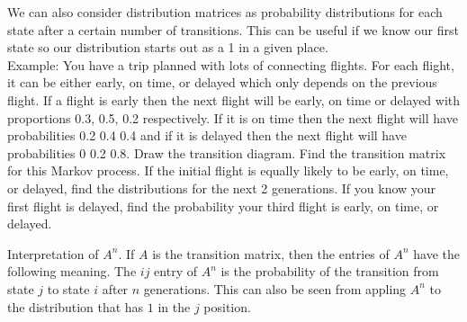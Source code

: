 \documentclass[14,fleqn]{article}
\begin{document}
We can also consider distribution matrices as probability distributions for each state after a certain number of transitions. This can be useful if we know our first state so our distribution starts out as a 1 in a given place.\\

Example: You have a trip planned with lots of connecting flights. For each flight, it can be either early, on time, or delayed which only depends on the previous flight. If a flight is early then the next flight will be early, on time or delayed with proportions 0.3, 0.5, 0.2 respectively.  If it is on time then the next flight will have probabilities 0.2 0.4 0.4 and if it is delayed then the next flight will have probabilities 0 0.2 0.8. Draw the transition diagram. Find the transition matrix for this Markov process. If the initial flight is equally likely to be early, on time, or delayed, find the distributions for the next 2 generations. If you know your first flight is delayed, find the probability your third flight is early, on time, or delayed.

Interpretation of $A^n.$ If $A$ is the transition matrix, then the entries of $A^n$ have the following meaning. The $ij$ entry of $A^n$ is the probability of the transition from state $j$ to state $i$ after $n$ generations. This can also be seen from appling $A^n$ to the distribution that has $1$ in the $j$ position.
\end{document}
